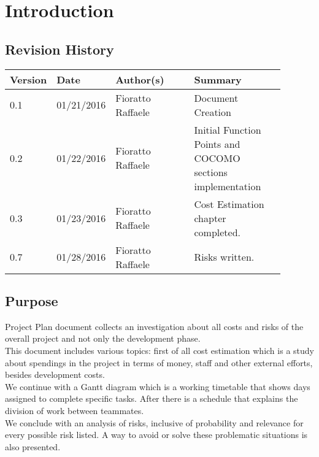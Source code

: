 \newpage
\section{Introduction}
\subsection{Revision History}
\begin{table}[H]
	\centering
	\begin{tabular*}{\linewidth}{|p{0.1\linewidth}|p{0.13\linewidth}|p{0.3099\linewidth}|p{0.3499\linewidth}|}
		\hline
		\textbf{Version} & \textbf{Date}       & \textbf{Author(s)}         & \textbf{Summary}           \\ \hline
		0.1     & 01/21/2016 & Fioratto Raffaele & Document Creation \\ \hline
		0.2     & 01/22/2016 & Fioratto Raffaele & Initial Function Points and COCOMO sections implementation \\ \hline
		0.3		& 01/23/2016 & Fioratto Raffaele &
		Cost Estimation chapter completed. \\ \hline
		0.7		& 01/28/2016 & Fioratto Raffaele &
		Risks written. \\ \hline
	\end{tabular*}
\end{table}
\break
\subsection{Purpose}
Project Plan document collects an investigation about all costs and risks of the overall project and not only the development phase.\\
This document includes various topics: first of all cost estimation which is a study about spendings in the project in terms of money, staff and other external efforts, besides development costs.\\
We continue with a Gantt diagram which is a working timetable that shows days assigned to complete specific tasks. After there is a schedule that explains the division of work between teammates.\\
We conclude with an analysis of risks, inclusive of probability and relevance for every possible risk listed. A way to avoid or solve these problematic situations is also presented. 

